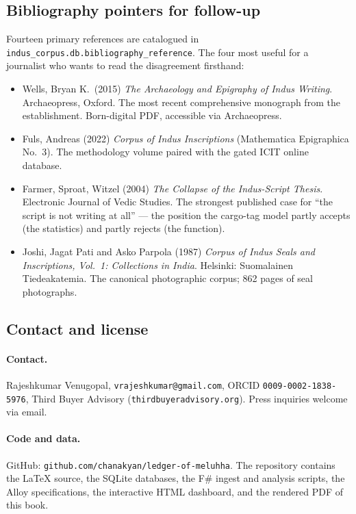 \subsection{Bibliography pointers for follow-up}

Fourteen primary references are catalogued in
\texttt{indus\_corpus.db.bibliography\_reference}. The four most
useful for a journalist who wants to read the disagreement
firsthand:

\begin{itemize}[nosep]
\item Wells, Bryan K.\ (2015) \textit{The Archaeology and
  Epigraphy of Indus Writing}. Archaeopress, Oxford. The most
  recent comprehensive monograph from the establishment.
  Born-digital PDF, accessible via Archaeopress.
\item Fuls, Andreas (2022) \textit{Corpus of Indus Inscriptions}
  (Mathematica Epigraphica No.~3). The methodology volume
  paired with the gated ICIT online database.
\item Farmer, Sproat, Witzel (2004) \textit{The Collapse of the
  Indus-Script Thesis}. Electronic Journal of Vedic Studies.
  The strongest published case for ``the script is not writing
  at all'' --- the position the cargo-tag model partly accepts
  (the statistics) and partly rejects (the function).
\item Joshi, Jagat Pati and Asko Parpola (1987) \textit{Corpus
  of Indus Seals and Inscriptions, Vol.~1: Collections in
  India}. Helsinki: Suomalainen Tiedeakatemia. The canonical
  photographic corpus; 862 pages of seal photographs.
\end{itemize}

\subsection{Contact and license}

\paragraph{Contact.} Rajeshkumar Venugopal,
\texttt{vrajeshkumar@gmail.com}, ORCID
\texttt{0009-0002-1838-5976}, Third Buyer Advisory
(\texttt{thirdbuyeradvisory.org}). Press inquiries welcome via
email.

\paragraph{Code and data.} GitHub:
\texttt{github.com/chanakyan/ledger-of-meluhha}. The repository
contains the LaTeX source, the SQLite databases, the F\# ingest
and analysis scripts, the Alloy specifications, the interactive
HTML dashboard, and the rendered PDF of this book.

